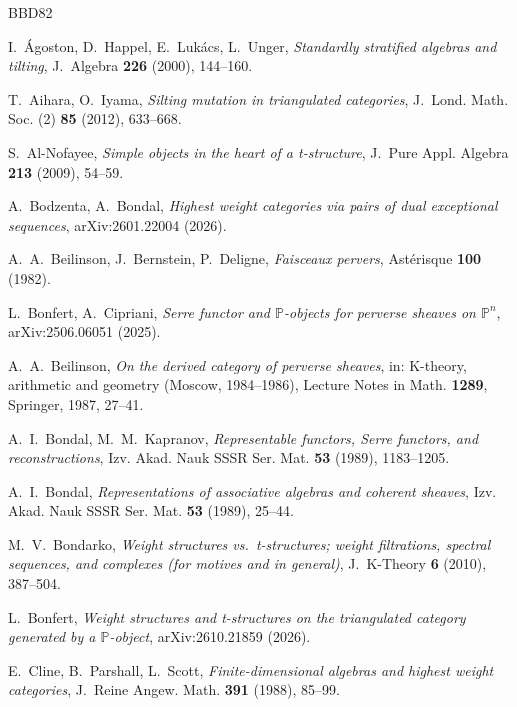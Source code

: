 \documentclass[11pt,reqno]{amsart}
\theoremstyle{plain}
\theoremstyle{definition}
\theoremstyle{remark}
\begin{document}
\begin{thebibliography}{BBD82}

I.~\'Agoston, D.~Happel, E.~Luk\'acs, L.~Unger, \emph{Standardly stratified algebras and tilting}, J.~Algebra \textbf{226} (2000), 144--160.

T.~Aihara, O.~Iyama, \emph{Silting mutation in triangulated categories}, J.~Lond. Math. Soc. (2) \textbf{85} (2012), 633--668.

S.~Al-Nofayee, \emph{Simple objects in the heart of a t-structure}, J.~Pure Appl. Algebra \textbf{213} (2009), 54--59.

A.~Bodzenta, A.~Bondal, \emph{Highest weight categories via pairs of dual exceptional sequences}, arXiv:2601.22004 (2026).

A.~A.~Beilinson, J.~Bernstein, P.~Deligne, \emph{Faisceaux pervers}, Ast\'erisque \textbf{100} (1982).

L.~Bonfert, A.~Cipriani, \emph{Serre functor and $\mathbb{P}$-objects for perverse sheaves on $\mathbb{P}^n$}, arXiv:2506.06051 (2025).

A.~A.~Beilinson, \emph{On the derived category of perverse sheaves}, in: K-theory, arithmetic and geometry (Moscow, 1984--1986), Lecture Notes in Math. \textbf{1289}, Springer, 1987, 27--41.

A.~I.~Bondal, M.~M.~Kapranov, \emph{Representable functors, Serre functors, and reconstructions}, Izv. Akad. Nauk SSSR Ser. Mat. \textbf{53} (1989), 1183--1205.

A.~I.~Bondal, \emph{Representations of associative algebras and coherent sheaves}, Izv. Akad. Nauk SSSR Ser. Mat. \textbf{53} (1989), 25--44.

M.~V.~Bondarko, \emph{Weight structures vs.\ t-structures; weight filtrations, spectral sequences, and complexes (for motives and in general)}, J.~K-Theory \textbf{6} (2010), 387--504.

L.~Bonfert, \emph{Weight structures and t-structures on the triangulated category generated by a $\mathbb{P}$-object}, arXiv:2610.21859 (2026).

E.~Cline, B.~Parshall, L.~Scott, \emph{Finite-dimensional algebras and highest weight categories}, J.~Reine Angew. Math. \textbf{391} (1988), 85--99.


\end{thebibliography}
\end{document}
